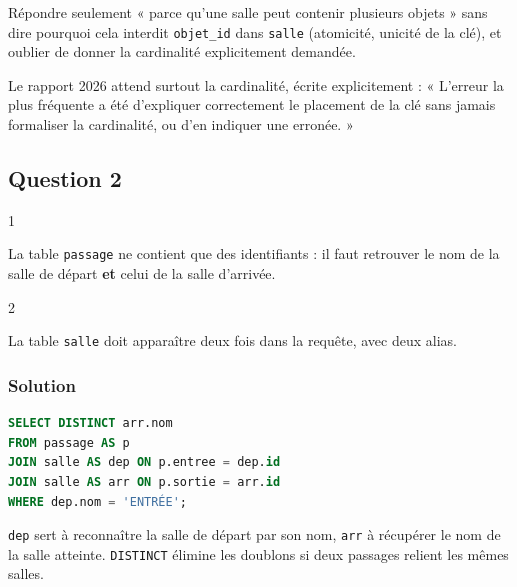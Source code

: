 \documentclass[11pt,a4paper]{article}
\begin{document}
\begin{piege}

Répondre seulement « parce qu'une salle peut contenir plusieurs objets » sans dire pourquoi cela interdit \texttt{objet\_id} dans \texttt{salle} (atomicité, unicité de la clé), et oublier de donner la cardinalité explicitement demandée.

\end{piege}

\begin{jury}

Le rapport 2026 attend surtout la cardinalité, écrite explicitement : « L'erreur la plus fréquente a été d'expliquer correctement le placement de la clé sans jamais formaliser la cardinalité, ou d'en indiquer une erronée. »

\end{jury}

\hypertarget{question-2}{%
\subsection{Question 2}\label{question-2}}

\begin{indication}{1}

La table \texttt{passage} ne contient que des identifiants : il faut retrouver le nom de la salle de départ \textbf{et} celui de la salle d'arrivée.

\end{indication}

\begin{indication}{2}

La table \texttt{salle} doit apparaître deux fois dans la requête, avec deux alias.

\end{indication}

\hypertarget{solution-1}{%
\subsubsection{Solution}\label{solution-1}}

\begin{lstlisting}[language=SQL]
SELECT DISTINCT arr.nom
FROM passage AS p
JOIN salle AS dep ON p.entree = dep.id
JOIN salle AS arr ON p.sortie = arr.id
WHERE dep.nom = 'ENTRÉE';
\end{lstlisting}

\texttt{dep} sert à reconnaître la salle de départ par son nom, \texttt{arr} à récupérer le nom de la salle atteinte. \texttt{DISTINCT} élimine les doublons si deux passages relient les mêmes salles.
\end{document}
